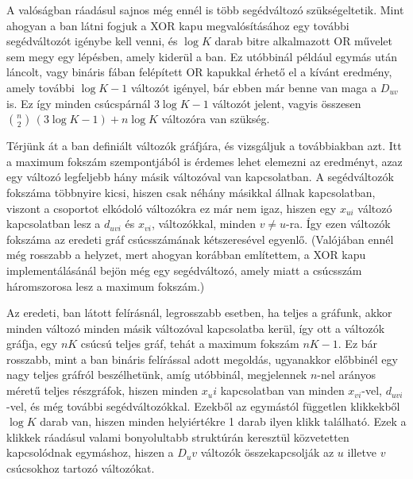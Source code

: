 A valóságban ráadásul sajnos még ennél is több segédváltozó szükségeltetik. Mint ahogyan a ban látni fogjuk a XOR kapu megvalósításához egy további segédváltozót igénybe kell venni, és $\log K$ darab bitre alkalmazott OR művelet sem megy egy lépésben, amely kiderül a ban. Ez utóbbinál például egymás után láncolt, vagy bináris fában felépített OR kapukkal érhető el a kívánt eredmény, amely további $\log K -1$ változót igényel, bár ebben már benne van maga a $D_{uv}$ is. Ez így minden csúcspárnál $3\log K - 1$ változót jelent, vagyis összesen $\binom{n}{2} \, (3\log K -  1 ) + n \log K$ változóra van szükség.
 
Térjünk át a ban definiált változók gráfjára, és vizsgáljuk a továbbiakban azt.
Itt a maximum fokszám szempontjából is érdemes lehet elemezni az eredményt, azaz egy változó legfeljebb hány másik változóval van kapcsolatban. A segédváltozók fokszáma többnyire kicsi, hiszen csak néhány másikkal állnak kapcsolatban, viszont a csoportot elkódoló változókra ez már nem igaz, hiszen egy $x_{ui}$ változó kapcsolatban lesz a $d_{uvi}$ és $x_{vi}$,  változókkal, minden $v \neq u$-ra. Így ezen változók fokszáma az eredeti gráf csúcsszámának kétszeresével egyenlő. (Valójában ennél még rosszabb a helyzet, mert ahogyan korábban említettem, a XOR kapu implementálásánál bejön még egy segédváltozó, amely miatt a csúcsszám háromszorosa lesz a maximum fokszám.)

%
%
%
%
%
%
%


 
Az eredeti, ban látott felírásnál, legrosszabb esetben, ha teljes a gráfunk, akkor minden változó minden másik változóval kapcsolatba kerül, így ott a változók gráfja, egy $nK$ csúcsú teljes gráf, tehát a maximum fokszám  $nK -1$. Ez bár rosszabb, mint a ban bináris felírással adott megoldás, ugyanakkor előbbinél egy nagy teljes gráfról beszélhetünk, amíg utóbbinál, megjelennek $n$-nel arányos méretű teljes részgráfok, hiszen minden $x_ui$ kapcsolatban van minden $x_{vi}$-vel, $d_{uvi}$-vel, és még további segédváltozókkal. Ezekből az egymástól független klikkekből $\log K$ darab van, hiszen minden helyiértékre 1 darab ilyen klikk található. Ezek a klikkek ráadásul valami bonyolultabb struktúrán keresztül közvetetten kapcsolódnak egymáshoz, hiszen a $D_uv$ változók összekapcsolják az $u$ illetve $v$ csúcsokhoz tartozó változókat.

